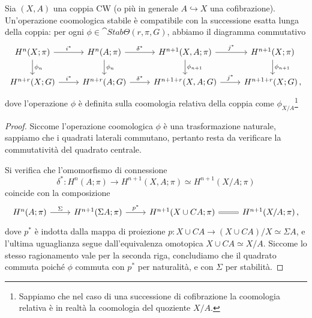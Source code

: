 	\begin{thm}
		Sia $(X,A)$ una coppia CW (o più in generale $A \hookrightarrow X$ una cofibrazione).
		Un'operazione coomologica stabile è compatibile con la successione esatta lunga della coppia:
		per ogni $\phi \in \cat{Stab}\Theta(r,\pi,G)$, abbiamo
		il diagramma commutativo
		\begin{equation*}
			\begin{tikzcd}
				H^{n}(X;\pi) \ar[r, "i^{*}"] \ar[d, "\phi_{n}"]
				& 	H^{n}(A;\pi) \ar[r, "\delta^{*}"] \ar[d, "\phi_{n}"]
				& H^{n+1}(X,A;\pi) \ar[d, "\phi_{n+1}"] \ar[r, "j^{*}"]
				& H^{n+1}(X;\pi) \ar[d, "\phi_{n+1}"] \\
				H^{n+r}(X;G) \ar[r, "i^{*}"]
				& 	H^{n+r}(A;G) \ar[r, "\delta^{*}"]
				& H^{n+1+r}(X,A;G)  \ar[r, "j^{*}"]
				& H^{n+1+r}(X;G) \,,
			\end{tikzcd}
		\end{equation*}			
		dove l'operazione $\phi$ è definita sulla coomologia relativa
		della coppia come $\phi_{X/A}$\footnote{Sappiamo che nel caso di una successione di cofibrazione la coomologia relativa è in realtà la coomologia del quoziente $X/A$.}
		\begin{proof}
			Siccome l'operazione coomologica $\phi$ è una trasformazione naturale,
			sappiamo che i quadrati laterali commutano, pertanto resta da verificare
			la commutatività del quadrato centrale.
			
			Si verifica che l'omomorfismo di connessione
			\begin{equation*}
				\delta^{*}: H^{n}(A;\pi) \longrightarrow H^{n+1}(X,A;\pi) \simeq H^{n+1}(X/A;\pi)
			\end{equation*}
			coincide con la composizione
			\begin{equation*}
				\begin{tikzcd}
					H^{n}(A;\pi) \ar[r, "\Sigma"]
					& H^{n+1}(\Sigma A;\pi) \ar[r, "p^{*}"]
					& H^{n+1}(X \cup CA;\pi) \ar[r, equals]
					& H^{n+1}(X/A;\pi)\,,
				\end{tikzcd}
			\end{equation*}
			dove $p^{*}$ è indotta dalla mappa di proiezione
			$p:X \cup CA \to (X \cup CA)/X \simeq \Sigma A$,
			e l'ultima uguaglianza segue dall'equivalenza omotopica
			$X \cup CA \simeq X/A$. Siccome lo stesso ragionamento
			vale per la seconda riga, concludiamo che il quadrato commuta
			poiché $\phi$ commuta con $p^{*}$ per naturalità,
			e con $\Sigma$ per stabilità.
		\end{proof}
	\end{thm}
